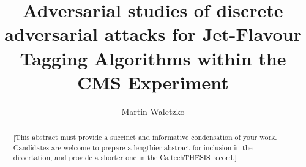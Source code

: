 \documentclass[12pt]{caltech_thesis}
\begin{document}
\title{Adversarial studies of discrete adversarial attacks for Jet-Flavour Tagging Algorithms within the CMS Experiment}
\author{Martin Waletzko}

\address{Aachen, Germany}                     %




\maketitle

\begin{acknowledgements} 	 
\end{acknowledgements}

\begin{abstract}
   [This abstract must provide a succinct and informative condensation of your work. Candidates are welcome to prepare a lengthier abstract for inclusion in the dissertation, and provide a shorter one in the CaltechTHESIS record.]
\end{abstract}

\tableofcontents
\listoffigures
\listoftables
\printnomenclature
\end{document}
